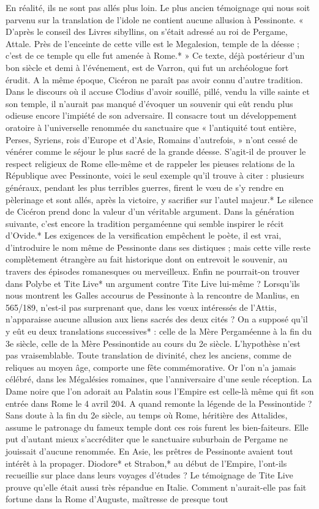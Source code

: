 \documentclass[a4paper, 11pt, oneside, polutonikogreek, french]{article}
\begin{document}
En réalité, ils ne sont pas allés plus loin. Le plus ancien témoignage qui nous soit parvenu sur la translation de l'idole ne contient aucune allusion à Pessinonte. « D'après le conseil des Livres sibyllins, on s'était adressé au roi de Pergame, Attale. Près de l'enceinte de cette ville est le Megalesion, temple de la déesse ; c'est de ce temple qu elle fut amenée à Rome.* » Ce texte, déjà postérieur d'un bon siècle et demi à l'événement, est de Varron, qui fut un archéologue fort érudit. A la même époque, Cicéron ne paraît pas avoir connu d'autre tradition. Dans le discours où il accuse Clodius d'avoir souillé, pillé, vendu la ville sainte et son temple, il n'aurait pas manqué d'évoquer un souvenir qui eût rendu plus odieuse encore l'impiété de son adversaire. Il consacre tout un développement oratoire à l'universelle renommée du sanctuaire que « l'antiquité tout entière, Perses, Syriens, rois d'Europe et d'Asie, Romains d'autrefois, » n'ont cessé de vénérer comme le séjour le plus sacré de la grande déesse. S'agit-il de prouver le respect religieux de Rome elle-même et de rappeler les pieuses relations de la République avec Pessinonte, voici le seul exemple qu'il trouve à citer : plusieurs généraux, pendant les plus terribles guerres, firent le vœu de s'y rendre en pèlerinage et sont allés, après la victoire, y sacrifier sur l'autel majeur.* Le silence de Cicéron prend donc la valeur d'un véritable argument. Dans la génération suivante, c'est encore la tradition pergaméenne qui semble inspirer le récit d'Ovide.* Les exigences de la versification empêchent le poète, il est vrai, d'introduire le nom même de Pessinonte dans ses distiques ; mais cette ville reste complètement étrangère au fait historique dont on entrevoit le souvenir, au travers des épisodes romanesques ou merveilleux. Enfin ne pourrait-on trouver dans Polybe et Tite Live* un argument contre Tite Live lui-même ? Lorsqu'ils nous montrent les Galles accourus de Pessinonte à la rencontre de Manlius, en 565/189, n'est-il pas surprenant que, dans les vœux intéressés de l'Attis, n'apparaisse aucune allusion aux liens sacrés des deux cités ? On a supposé qu'il y eût eu deux translations successives* : celle de la Mère Pergaméenne à la fin du 3e siècle, celle de la Mère Pessinontide au cours du 2e siècle. L'hypothèse n'est pas vraisemblable. Toute translation de divinité, chez les anciens, comme de reliques au moyen âge, comporte une fête commémorative. Or l'on n'a jamais célébré, dans les Mégalésies romaines, que l'anniversaire d'une seule réception. La Dame noire que l'on adorait au Palatin sous l'Empire est celle-là même qui fit son entrée dans Rome le 4 avril 204. A quand remonte la légende de la Pessinontide ? Sans doute à la fin du 2e siècle, au temps où Rome, héritière des Attalides, assume le patronage du fameux temple dont ces rois furent les bien-faiteurs. Elle put d'autant mieux s'accréditer que le sanctuaire suburbain de Pergame ne jouissait d'aucune renommée. En Asie, les prêtres de Pessinonte avaient tout intérêt à la propager. Diodore* et Strabon,* au début de l'Empire, l'ont-ils recueillie sur place dans leurs voyages d'études ? Le témoignage de Tite Live prouve qu'elle était aussi très répandue en Italie. Comment n'aurait-elle pas fait fortune dans la Rome d'Auguste, maîtresse de presque tout 
\end{document}
